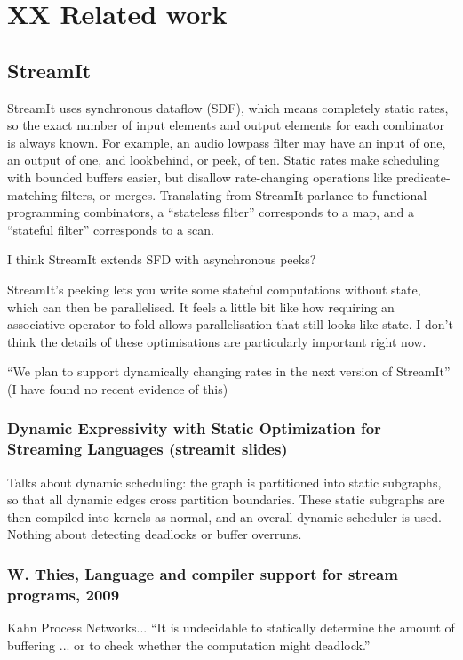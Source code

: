 \section{XX Related work}
\label{s:Related}

\subsection{StreamIt}
StreamIt\cite{thies2002streamit} uses synchronous dataflow (SDF), which means completely static rates, so the exact number of input elements and output elements for each combinator is always known.
For example, an audio lowpass filter may have an input of one, an output of one, and lookbehind, or peek, of ten.
Static rates make scheduling with bounded buffers easier, but disallow rate-changing operations like predicate-matching filters, or merges.
Translating from StreamIt parlance to functional programming combinators, a ``stateless filter'' corresponds to a map, and a ``stateful filter'' corresponds to a scan.

I think StreamIt extends SFD with asynchronous peeks?

StreamIt's peeking lets you write some stateful computations without state, which can then be parallelised.
It feels a little bit like how requiring an associative operator to fold allows parallelisation that still looks like state.
I don't think the details of these optimisations are particularly important right now.
\cite{gordon2010compiler}



``We plan to support dynamically changing rates in the next version of StreamIt''\cite{thies2002streamit} (I have found no recent evidence of this)

\subsubsection{Dynamic Expressivity with Static Optimization for Streaming Languages (streamit slides)}
Talks about dynamic scheduling: the graph is partitioned into static subgraphs, so that all dynamic edges cross partition boundaries. These static subgraphs are then compiled into kernels as normal, and an overall dynamic scheduler is used.
Nothing about detecting deadlocks or buffer overruns.

\subsubsection{W. Thies, Language and compiler support for stream programs, 2009}
Kahn Process Networks...
``It is undecidable to statically determine the amount of buffering ... or to check whether the computation might deadlock.''\cite{thies2009language}

